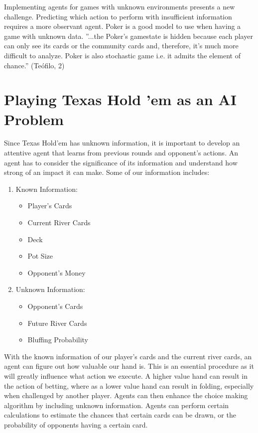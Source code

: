 \documentclass[10pt, a4paper, twocolumn]{article} %
\newcommand*\Hs[1]{\ensuremath{{\color{blue} #1}{\color{red}\varheartsuit}}}
\newcommand*\Ss[1]{\ensuremath{{\color{blue} #1}{\color{black}\spadesuit}}}
\newcommand*\Ds[1]{\ensuremath{{\color{blue} #1}{\color{red}\vardiamondsuit}}}
\newcommand*\Cs[1]{\ensuremath{{\color{blue} #1}{\color{black}\clubsuit}}}
\begin{document}
Implementing agents for games with unknown environments presents a new challenge. Predicting which action to perform with insufficient information requires a more observant agent. Poker is a good model to use when having a game with unknown data. ''...the Poker’s gamestate is hidden because each player can only see its cards or the community cards and,
therefore, it’s much more difficult to analyze. Poker is also stochastic game i.e. it admits the element of chance.'' (Teófilo, 2)

\section{Playing Texas Hold 'em as an AI Problem}

Since Texas Hold'em has unknown information, it is important to develop an attentive agent that learns from previous rounds and opponent's actions. An agent has to consider the significance of its information and understand how strong of an impact it can make. Some of our information includes:

\begin{enumerate}
	\item Known Information:
	\begin{itemize}
		\item Player's Cards
		\item Current River Cards
		\item Deck
		\item Pot Size
		\item Opponent's Money
	\end{itemize}
	\item Unknown Information:
	\begin{itemize}
		\item Opponent's Cards
		\item Future River Cards
		\item Bluffing Probability
	\end{itemize}
\end{enumerate}

\indent With the known information of our player's cards and the current river cards, an agent can figure out how valuable our hand is. This is an essential procedure as it will greatly influence what action we execute. A higher value hand can result in the action of betting, where as a lower value hand can result in folding, especially when challenged by another player. Agents can then enhance the choice making algorithm by including unknown information. Agents can perform certain calculations to estimate the chances that certain cards can be drawn, or the probability of opponents having a certain card.
\end{document}
